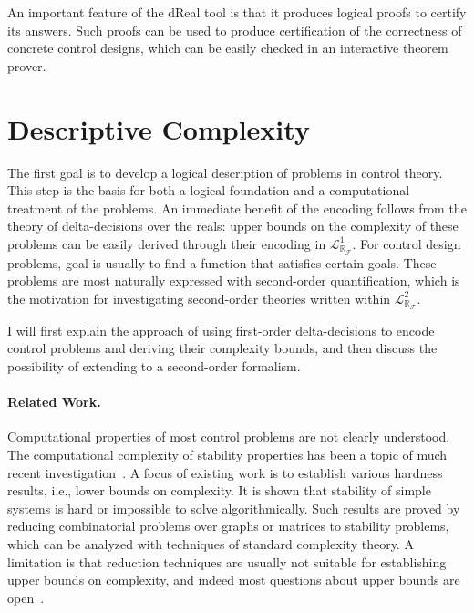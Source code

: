 \documentclass[11pt]{article}
\newcommand{\lrf}{\mathcal{L}_{\mathbb{R}_{\mathcal{F}}}}
\theoremstyle{definition}
\begin{document}
An important feature of the dReal tool is that it produces logical proofs to certify its answers. Such proofs can be used to produce certification of the correctness of concrete control designs, which can be easily checked in an interactive theorem prover. 

\section{Descriptive Complexity}\label{dc}

The first goal is to develop a logical description of problems in control theory. This step is the basis for both a logical foundation and a computational treatment of the problems. An immediate benefit of the encoding follows from the theory of delta-decisions over the reals: upper bounds on the complexity of these problems can be easily derived through their encoding in $\lrf^1$. For control design problems, goal is usually to find a function that satisfies certain goals. These problems are most naturally expressed with second-order quantification, which is the motivation for investigating second-order theories written within $\lrf^2$. 

I will first explain the approach of using first-order delta-decisions to encode control problems and deriving their complexity bounds, and then discuss the possibility of extending to a second-order formalism. 

\paragraph{Related Work.} Computational properties of most control problems are not clearly understood. The computational complexity of stability properties has been a topic of much recent investigation~\cite{DBLP:journals/corr/AhmadiP13,DBLP:journals/automatica/BlondelT99,DBLP:journals/automatica/BlondelT00,AAAthesis,DBLP:conf/hybrid/PrabhakarV13,DBLP:journals/corr/abs-1210-7420}. A focus of existing work is to establish various hardness results, i.e., lower bounds on complexity. It is shown that stability of simple systems is hard or impossible to solve algorithmically. Such results are proved by reducing combinatorial problems over graphs or matrices to stability problems, which can be analyzed with techniques of standard complexity theory. A limitation is that reduction techniques are usually not suitable for establishing upper bounds on complexity, and indeed most questions about upper bounds are open~\cite{AAAthesis}. 
\end{document}
